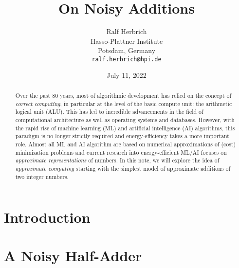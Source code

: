 \documentclass{article}
\title{On Noisy Additions}
\date{July 11, 2022}		%
\author{Ralf Herbrich \\
	Hasso-Plattner Institute\\
	Potsdam, Germany \\
	\texttt{ralf.herbrich@hpi.de} \\
}
\newcommand{\0}{\boldsymbol{0}}
\newcommand{\1}{\boldsymbol{1}}
\begin{document}
\maketitle

\begin{abstract}
	Over the past 80 years, most of algorithmic development has relied on the concept of {\em correct computing}, in particular at the level of the basic compute unit: the arithmetic logical unit (ALU). This has led to incredible advancements in the field of computational architecture as well as operating systems and databases. However, with the rapid rise of machine learning (ML) and artificial intelligence (AI) algorithms, this paradigm is no longer strictly required and energy-efficiency takes a more important role. Almost all ML and AI algorithm are based on numerical approximations of (cost) minimization problems and current research into energy-efficient ML/AI focuses on {\em approximate representations} of numbers. In this note, we will explore the idea of {\em approximate computing} starting with the simplest model of approximate additions of two integer numbers.
\end{abstract}




\section{Introduction}


\section{A Noisy Half-Adder}



 
\end{document}
